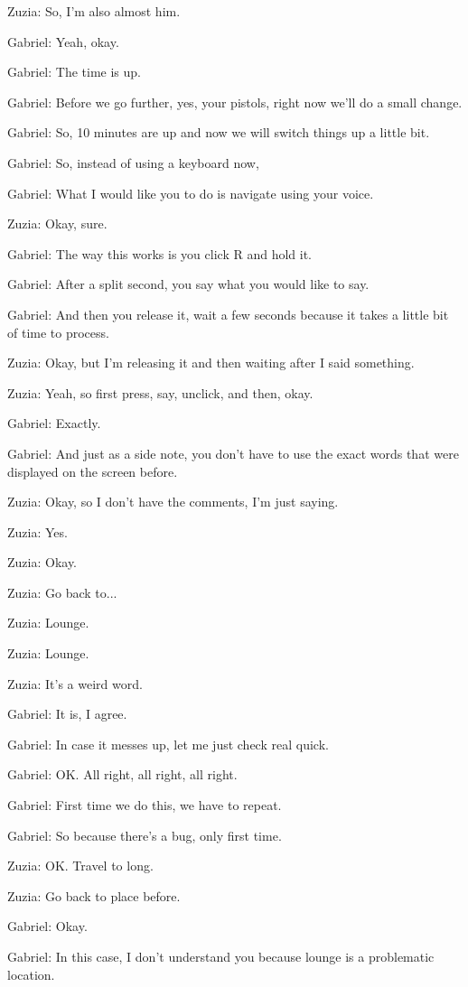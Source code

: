 Zuzia: So, I'm also almost him.

Gabriel: Yeah, okay.

Gabriel: The time is up.

Gabriel: Before we go further, yes, your pistols, right now we'll do a small change.

Gabriel: So, 10 minutes are up and now we will switch things up a little bit.

Gabriel: So, instead of using a keyboard now,

Gabriel: What I would like you to do is navigate using your voice.

Zuzia: Okay, sure.

Gabriel: The way this works is you click R and hold it.

Gabriel: After a split second, you say what you would like to say.

Gabriel: And then you release it, wait a few seconds because it takes a little bit of time to process.

Zuzia: Okay, but I'm releasing it and then waiting after I said something.

Zuzia: Yeah, so first press, say, unclick, and then, okay.

Gabriel: Exactly.

Gabriel: And just as a side note, you don't have to use the exact words that were displayed on the screen before.

Zuzia: Okay, so I don't have the comments, I'm just saying.

Zuzia: Yes.

Zuzia: Okay.

Zuzia: Go back to...

Zuzia: Lounge.

Zuzia: Lounge.

Zuzia: It's a weird word.

Gabriel: It is, I agree.

Gabriel: In case it messes up, let me just check real quick.

Gabriel: OK. All right, all right, all right.

Gabriel: First time we do this, we have to repeat.

Gabriel: So because there's a bug, only first time.

Zuzia: OK. Travel to long.

Zuzia: Go back to place before.

Gabriel: Okay.

Gabriel: In this case, I don't understand you because lounge is a problematic location.

